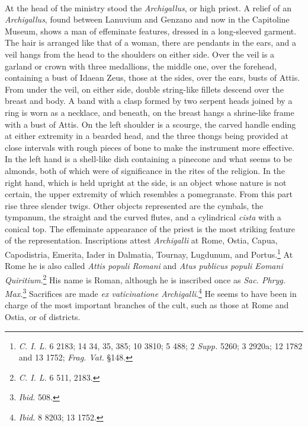 \documentclass[a4paper, 11pt, oneside, polutonikogreek, french]{article}
\begin{document}
\paragraph{}
At the head of the ministry stood the \emph{Archigallus}, or high priest. A relief of an \emph{Archigallus}, found between Lanuvium and Genzano and now in the Capitoline Museum, shows a man of effeminate features, dressed in a long-sleeved garment. The hair is arranged like that of a woman, there are pendants in the ears, and a veil hangs from the head to the shoulders on either side. Over the veil is a garland or
crown with three medallions, the middle one, over the forehead, containing a bust of Idaean Zeus, those at the sides, over the ears, busts of Attis. From under the veil, on either side, double string-like fillets descend over the breast and body. A band with a clasp formed by two serpent heads joined by a ring is worn as a necklace, and beneath, on the breast hangs a shrine-like frame with a bust of Attis. On the left shoulder is a scourge, the carved handle ending at either extremity in a bearded head, and the three thongs being provided at close intervals with rough pieces of bone to make the instrument more effective. In the left hand is a shell-like dish containing a pinecone and what seems to be almonds, both of which were of significance in the rites of the religion. In the right hand, which is held upright at the side, is an object whose nature is not certain, the upper extremity of which resembles a pomegranate. From this part rise three slender twigs. Other objects represented are the cymbals, the tympanum, the straight and the curved flutes, and a cylindrical \emph{cista} with a conical top. The effeminate appearance of the priest is the most striking feature of the representation. Inscriptions attest \emph{Archigalli} at Rome, Ostia, Capua, Capodistria, Emerita, Iader in Dalmatia, Tournay, Lugdunum, and Portus.\footnote{\emph{C. I. L.} 6 2183; 14 34, 35, 385; 10 3810; 5 488; 2 \emph{Supp.} 5260; 3 2920a; 12 1782 and 13 1752; \emph{Frag. Vat.} §148.} At Rome he is also called \emph{Attis populi Romani} and \emph{Atus publicus populi Eomani Quiritium}.\footnote{\emph{C. I. L.} 6 511, 2183.} His name is Roman, although he is inscribed once as \emph{Sac. Phryg. Max.}\footnote{\emph{Ibid.} 508.} Sacrifices are made \emph{ex vaticinatione Archigalli}.\footnote{\emph{Ibid.} 8 8203; 13 1752.} He seems to have been in charge of the most important branches of the cult, such as those at Rome and Ostia, or of districts.
\end{document}
